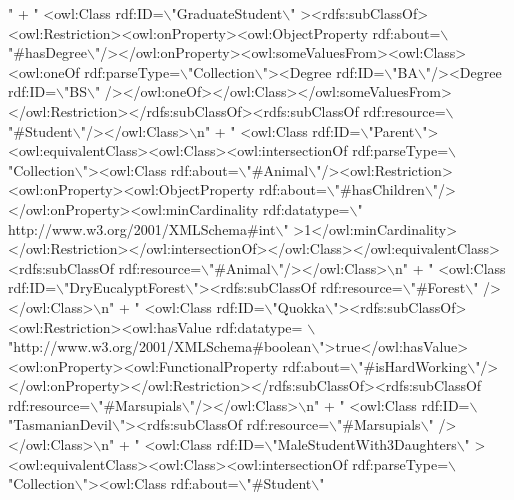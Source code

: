 \begin{DoxyCode}
{      "}
            + \textcolor{stringliteral}{"  <owl:Class rdf:ID=\(\backslash\)"GraduateStudent\(\backslash\)"
      ><rdfs:subClassOf><owl:Restriction><owl:onProperty><owl:ObjectProperty rdf:about=\(\backslash\)"#hasDegree\(\backslash\)"/></owl:onProperty><owl:someValuesFrom><owl:Class><owl:oneOf
       rdf:parseType=\(\backslash\)"Collection\(\backslash\)"><Degree rdf:ID=\(\backslash\)"BA\(\backslash\)"/><Degree rdf:ID=\(\backslash\)"BS\(\backslash\)"
      /></owl:oneOf></owl:Class></owl:someValuesFrom></owl:Restriction></rdfs:subClassOf><rdfs:subClassOf rdf:resource=\(\backslash\)"#Student\(\backslash\)"/></owl:Class>\(\backslash\)n"}
            + \textcolor{stringliteral}{"  <owl:Class rdf:ID=\(\backslash\)"Parent\(\backslash\)"><owl:equivalentClass><owl:Class><owl:intersectionOf
       rdf:parseType=\(\backslash\)"Collection\(\backslash\)"><owl:Class rdf:about=\(\backslash\)"#Animal\(\backslash\)"/><owl:Restriction><owl:onProperty><owl:ObjectProperty
       rdf:about=\(\backslash\)"#hasChildren\(\backslash\)"/></owl:onProperty><owl:minCardinality rdf:datatype=\(\backslash\)"
      http://www.w3.org/2001/XMLSchema#int\(\backslash\)"
      >1</owl:minCardinality></owl:Restriction></owl:intersectionOf></owl:Class></owl:equivalentClass><rdfs:subClassOf rdf:resource=\(\backslash\)"#Animal\(\backslash\)"/></owl:Class>\(\backslash\)n"}
            + \textcolor{stringliteral}{"  <owl:Class rdf:ID=\(\backslash\)"DryEucalyptForest\(\backslash\)"><rdfs:subClassOf rdf:resource=\(\backslash\)"#Forest\(\backslash\)"
      /></owl:Class>\(\backslash\)n"}
            + \textcolor{stringliteral}{"  <owl:Class rdf:ID=\(\backslash\)"Quokka\(\backslash\)"><rdfs:subClassOf><owl:Restriction><owl:hasValue rdf:datatype=
      \(\backslash\)"http://www.w3.org/2001/XMLSchema#boolean\(\backslash\)">true</owl:hasValue><owl:onProperty><owl:FunctionalProperty
       rdf:about=\(\backslash\)"#isHardWorking\(\backslash\)"/></owl:onProperty></owl:Restriction></rdfs:subClassOf><rdfs:subClassOf
       rdf:resource=\(\backslash\)"#Marsupials\(\backslash\)"/></owl:Class>\(\backslash\)n"}
            + \textcolor{stringliteral}{"  <owl:Class rdf:ID=\(\backslash\)"TasmanianDevil\(\backslash\)"><rdfs:subClassOf rdf:resource=\(\backslash\)"#Marsupials\(\backslash\)"
      /></owl:Class>\(\backslash\)n"}
            + \textcolor{stringliteral}{"  <owl:Class rdf:ID=\(\backslash\)"MaleStudentWith3Daughters\(\backslash\)"
      ><owl:equivalentClass><owl:Class><owl:intersectionOf rdf:parseType=\(\backslash\)"Collection\(\backslash\)"><owl:Class rdf:about=\(\backslash\)"#Student\(\backslash\)"
}
\end{DoxyCode}
